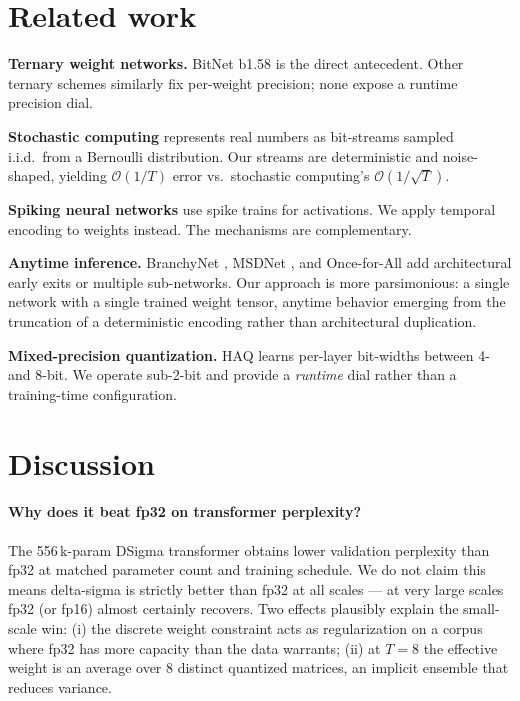 \documentclass[11pt]{article}
\begin{document}
\section{Related work}

\textbf{Ternary weight networks.} BitNet b1.58 \citep{ma2024bitnet}
is the direct antecedent. Other ternary schemes
\citep{li2016ternary, zhu2017ttq, wan2018tbn} similarly fix
per-weight precision; none expose a runtime precision dial.

\textbf{Stochastic computing} \citep{gaines1969stochastic,
brown2001stochastic} represents real numbers as bit-streams sampled
i.i.d.\ from a Bernoulli distribution. Our streams are deterministic
and noise-shaped, yielding $\mathcal{O}(1/T)$ error vs.\ stochastic
computing's $\mathcal{O}(1/\sqrt{T})$.

\textbf{Spiking neural networks} use spike trains for activations. We
apply temporal encoding to weights instead. The mechanisms are
complementary.

\textbf{Anytime inference.} BranchyNet
\citep{teerapittayanon2016branchynet}, MSDNet \citep{huang2018msdnet},
and Once-for-All \citep{cai2020onceforall} add architectural early
exits or multiple sub-networks. Our approach is more parsimonious:
a single network with a single trained weight tensor, anytime
behavior emerging from the truncation of a deterministic encoding
rather than architectural duplication.

\textbf{Mixed-precision quantization.} HAQ \citep{wang2019haq} learns
per-layer bit-widths between 4- and 8-bit. We operate sub-2-bit and
provide a \emph{runtime} dial rather than a training-time
configuration.

\section{Discussion}

\paragraph{Why does it beat fp32 on transformer perplexity?}
The 556\,k-param DSigma transformer obtains lower validation
perplexity than fp32 at matched parameter count and training
schedule. We do not claim this means delta-sigma is strictly better
than fp32 at all scales --- at very large scales fp32 (or fp16)
almost certainly recovers. Two effects plausibly explain the
small-scale win: (i) the discrete weight constraint acts as
regularization on a corpus where fp32 has more capacity than the
data warrants; (ii) at $T=8$ the effective weight is an average over
8 distinct quantized matrices, an implicit ensemble that reduces
variance.
\end{document}
